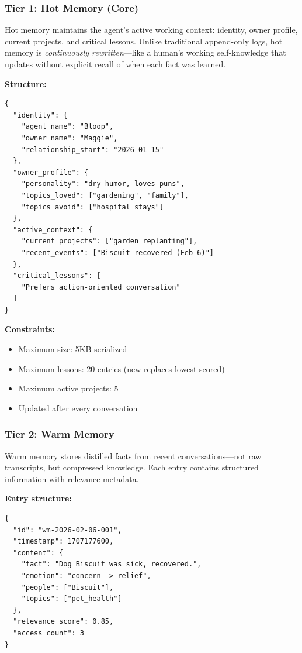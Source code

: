 \documentclass{article}
\begin{document}
\subsubsection{Tier 1: Hot Memory (Core)}

Hot memory maintains the agent's active working context: identity, owner profile, current projects, and critical lessons. Unlike traditional append-only logs, hot memory is \textit{continuously rewritten}—like a human's working self-knowledge that updates without explicit recall of when each fact was learned.

\textbf{Structure:}
\begin{lstlisting}[style=jsoncode]
{
  "identity": {
    "agent_name": "Bloop",
    "owner_name": "Maggie",
    "relationship_start": "2026-01-15"
  },
  "owner_profile": {
    "personality": "dry humor, loves puns",
    "topics_loved": ["gardening", "family"],
    "topics_avoid": ["hospital stays"]
  },
  "active_context": {
    "current_projects": ["garden replanting"],
    "recent_events": ["Biscuit recovered (Feb 6)"]
  },
  "critical_lessons": [
    "Prefers action-oriented conversation"
  ]
}
\end{lstlisting}

\textbf{Constraints:}
\begin{itemize}[leftmargin=*]
    \item Maximum size: 5KB serialized
    \item Maximum lessons: 20 entries (new replaces lowest-scored)
    \item Maximum active projects: 5
    \item Updated after every conversation
\end{itemize}

\subsubsection{Tier 2: Warm Memory}

Warm memory stores distilled facts from recent conversations—not raw transcripts, but compressed knowledge. Each entry contains structured information with relevance metadata.

\textbf{Entry structure:}
\begin{lstlisting}[style=jsoncode]
{
  "id": "wm-2026-02-06-001",
  "timestamp": 1707177600,
  "content": {
    "fact": "Dog Biscuit was sick, recovered.",
    "emotion": "concern -> relief",
    "people": ["Biscuit"],
    "topics": ["pet_health"]
  },
  "relevance_score": 0.85,
  "access_count": 3
}
\end{lstlisting}
\end{document}
